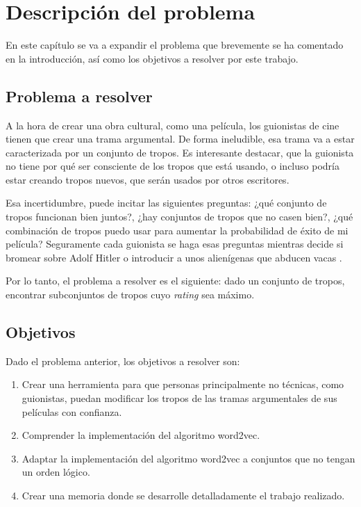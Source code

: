 \chapter{Descripción del problema}

En este capítulo se va a expandir el problema que brevemente se ha comentado en
la introducción, así como los objetivos a resolver por este trabajo.

\section{Problema a resolver}

A la hora de crear una obra cultural, como una película, los guionistas de cine
tienen que crear una trama argumental. De forma ineludible, esa trama va a
estar caracterizada por un conjunto de tropos. Es interesante destacar, que la
guionista no tiene por qué ser consciente de los tropos que está usando, o incluso podría estar creando tropos nuevos, que serán usados por otros
escritores.

Esa incertidumbre, puede incitar las siguientes preguntas: ¿qué conjunto de
tropos funcionan bien juntos?, ¿hay conjuntos de tropos que no casen bien?,
¿qué combinación de tropos puedo usar para aumentar la probabilidad de éxito de
mi película? Seguramente cada guionista se haga esas preguntas mientras decide
si bromear sobre Adolf Hitler \cite{tropo:AdolfHitlarious} o introducir a unos
alienígenas que abducen vacas \cite{tropo:AliensStealCattle}.

Por lo tanto, el problema a resolver es el siguiente: dado un conjunto de
tropos, encontrar subconjuntos de tropos cuyo \emph{rating} sea máximo.

\section{Objetivos} \label{section:goals}

Dado el problema anterior, los objetivos a resolver son:

\begin{enumerate}
      \item \label{obj:1} Crear una herramienta para que personas principalmente no técnicas, como
            guionistas, puedan modificar los tropos de las tramas argumentales de sus películas con confianza.
      \item \label{obj:2} Comprender la implementación del algoritmo word2vec.
      \item \label{obj:3} Adaptar la implementación del algoritmo word2vec a conjuntos que no tengan un orden lógico.
      \item \label{obj:4} Crear una memoria donde se desarrolle detalladamente el trabajo realizado.
\end{enumerate}
